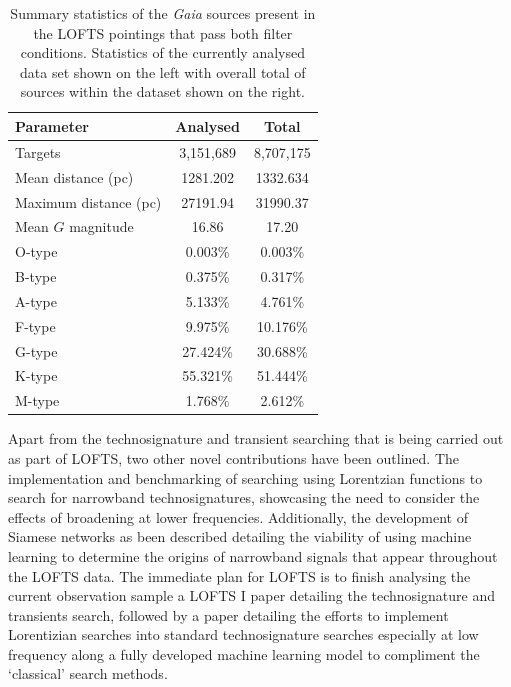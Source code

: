 \begin{table}[htbp]
\centering


\begin{tabular}{l|c|c}
\toprule
\textbf{Parameter} & \textbf{Analysed} & \textbf{Total} \\
\midrule
Targets                             & 3,151,689 & 8,707,175 \\
Mean distance (pc)                  & 1281.202  & 1332.634 \\
Maximum distance (pc)               & 27191.94 & 31990.37 \\
Mean $G$ magnitude                  & 16.86    & 17.20 \\
\midrule
O-type                              & 0.003\%   & 0.003\% \\
B-type                              & 0.375\%   & 0.317\% \\
A-type                              & 5.133\%   & 4.761\% \\
F-type                              & 9.975\%   & 10.176\% \\
G-type                              & 27.424\%  & 30.688\% \\
K-type                              & 55.321\%  & 51.444\% \\
M-type                              & 1.768\%   & 2.612\% \\
\hline \hline 
\end{tabular}
\caption[Summary statistics of the \textit{Gaia} sources.]{Summary statistics of the \textit{Gaia} sources present in the LOFTS pointings that pass both filter conditions. Statistics of the currently analysed data set shown on the left with overall total of sources within the dataset shown on the right.}
\label{tab:LOFTS_stats}
\end{table}


Apart from the technosignature and transient searching that is being carried out as part of LOFTS, two other novel contributions have been outlined. The implementation and benchmarking of searching using Lorentzian functions to search for narrowband technosignatures, showcasing the need to consider the effects of broadening at lower frequencies. Additionally, the development of Siamese networks as been described detailing the viability of using machine learning to determine the origins of narrowband signals that appear throughout the LOFTS data. The immediate plan for LOFTS is to finish analysing the current observation sample a LOFTS I paper detailing the technosignature and transients search, followed by a paper detailing the efforts to implement Lorentizian searches into standard technosignature searches especially at low frequency along a fully developed machine learning model to compliment the `classical' search methods. 

